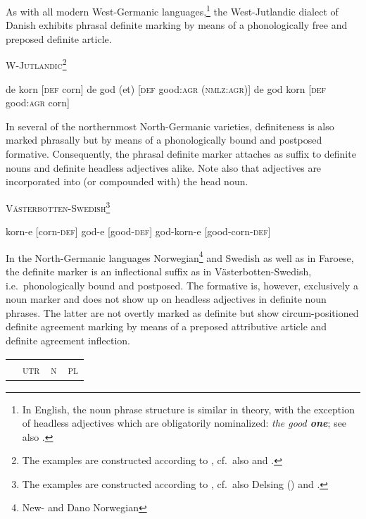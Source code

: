 {As with all modern West-Germanic languages,\footnote{In English, the noun phrase structure is similar in theory, with the exception of headless adjectives which are obligatorily nominalized: \textit{the good \textbf{one}}; see also .} the West-Jutlandic dialect of Danish exhibits phrasal definite marking by means of a phonologically free and preposed definite article.
\begin{exe}
\ex \textsc{W-Jutlandic}\footnote{The examples are constructed according to \cite{lund1932}, cf.~also \citet[121–122]{delsing1993} and \citet{dahl2003}.}
\begin{xlist}
\ex de korn [\textsc{def} corn]
\ex de god (et) [\textsc{def} good:\textsc{agr} (\textsc{nmlz:agr})]
\ex de god korn [\textsc{def} good:\textsc{agr} corn]
\end{xlist}
\end{exe}
In several of the northernmost North-Germanic varieties, definiteness is also marked phrasally but by means of a phonologically bound and postposed formative. Consequently, the phrasal definite marker attaches as suffix to definite nouns and definite headless adjectives alike. Note also that adjectives are incorporated into (or compounded with) the head noun. 
\begin{exe}
\ex \textsc{Västerbotten-Swedish}\footnote{The examples are constructed according to \cite{astrom1893}, cf.~also Delsing (\citeyear[122–123]{delsing1993}) and \cite{dahl2003}.}
\begin{xlist}
\ex korn-e [corn-\textsc{def}]
\ex god-e [good-\textsc{def}]
\ex god-korn-e [good-corn-\textsc{def}]
\end{xlist}
\end{exe}
In the North-Germanic languages Norwegian\footnote{New- and Dano Norwegian} and Swedish as well as in Faroese, the definite marker is an inflectional suffix as in Västerbotten-Swedish, i.e.~phonologically bound and postposed. The formative is, however, exclusively a noun marker and does not show up on headless adjectives in definite noun phrases. The latter are not overtly marked as definite but show circum-positioned definite agreement marking by means of a preposed attributive article and definite agreement inflection.
\begin{table}[h]
\begin{center}
\begin{footnotesize}
\begin{tabular}{l | ccc}
\hline
\hline
&\textsc{utr}	&\textsc{n}		&\textsc{pl}\\

\end{tabular}
\end{footnotesize}
\end{center}
\end{table}}
